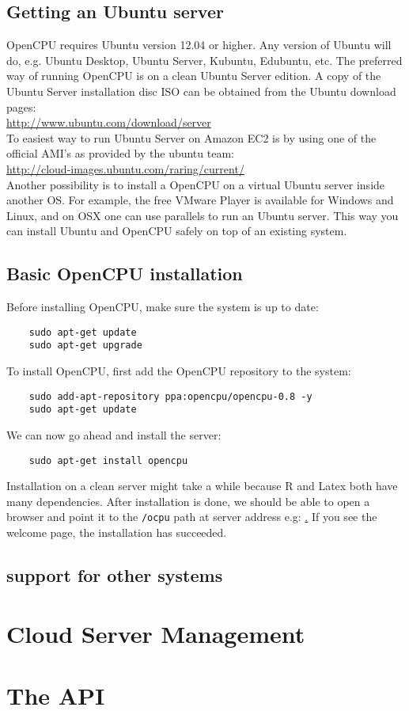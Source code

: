\documentclass{scrartcl}\usepackage[]{graphicx}\usepackage[]{color}
\begin{document}
\subsection{Getting an Ubuntu server}

OpenCPU requires Ubuntu version 12.04 or higher. Any version of Ubuntu will do, e.g. Ubuntu Desktop, Ubuntu Server, Kubuntu, Edubuntu, etc. The preferred way of running OpenCPU is on a clean Ubuntu Server edition. A copy of the Ubuntu Server installation disc ISO can be obtained from the Ubuntu download pages: \\

\url{http://www.ubuntu.com/download/server} \\

\noindent To easiest way to run Ubuntu Server on Amazon EC2 is by using
one of the official AMI's as provided by the ubuntu team: \\

\url{http://cloud-images.ubuntu.com/raring/current/} \\

\noindent Another possibility is to install a OpenCPU on a virtual Ubuntu server
inside another OS. For example, the free VMware Player is available for Windows 
and Linux, and on OSX one can use parallels to run an Ubuntu server. This way
you can install Ubuntu and OpenCPU safely on top of an existing system. \\

\subsection{Basic OpenCPU installation}

Before installing OpenCPU, make sure the system is up to date:

\begin{verbatim}
    sudo apt-get update
    sudo apt-get upgrade
\end{verbatim}
To install OpenCPU, first add the OpenCPU repository to the system:

\begin{verbatim}
    sudo add-apt-repository ppa:opencpu/opencpu-0.8 -y
    sudo apt-get update
\end{verbatim}
We can now go ahead and install the server:

\begin{verbatim}
    sudo apt-get install opencpu
\end{verbatim}
Installation on a clean server might take a while because R and Latex both have many dependencies. After installation is done, we should be able to open a browser and point it to the \texttt{/ocpu} path at server address e.g: \href{http://my.server.com/ocpu}. If you see the welcome page, the installation has succeeded.



\subsection{support for other systems}


\section{Cloud Server Management}





\section{The API}
\end{document}
